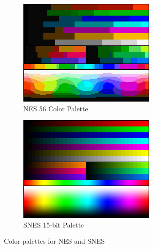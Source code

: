 \documentclass[10pt,twocolumn,letterpaper]{article}
\begin{document}
\begin{figure}[htp]
   \centering
   \begin{subfigure}[b]{0.235\textwidth}
      \includegraphics[width=\textwidth]{figures/NES_palette_color_test_chart.png}
      \caption{NES 56 Color Palette}
      \label{fig:nes}
   \end{subfigure}
   \begin{subfigure}[b]{0.235\textwidth}
      \includegraphics[width=\textwidth]{figures/SNES_palette_color_test_chart.png}
      \caption{SNES 15-bit Palette}
      \label{fig:snes}
   \end{subfigure}
   \caption{Color palettes for NES and SNES}
\end{figure}
\end{document}
